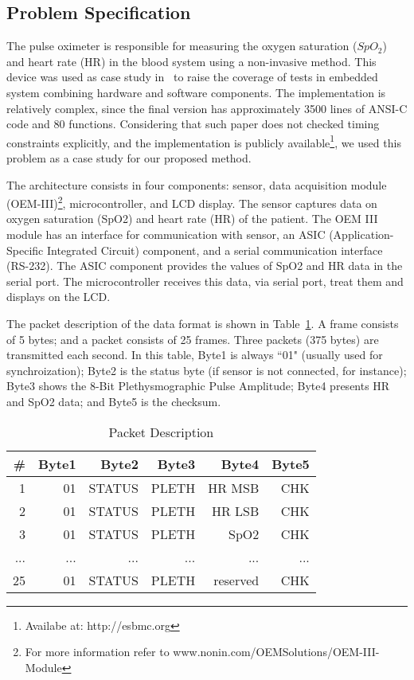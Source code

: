 \documentclass{llncs}
\begin{document}
\subsection{Problem Specification}

The pulse oximeter is responsible for measuring the oxygen saturation ($SpO_2$) and heart rate (HR) in the blood system using a
non-invasive method. 
This device was used as case study in~\cite{Cordeiro09} to raise the coverage of tests in embedded system combining
hardware and software components. The implementation is relatively complex, since the final version has approximately 3500 lines of ANSI-C code 
and 80 functions. 
Considering that such paper does not checked timing constraints explicitly, 
and the implementation is publicly available\footnote{Availabe at: http://esbmc.org}, 
we used this problem as a case study for our proposed method.

The architecture consists in four components: sensor, data acquisition module 
(OEM-III)\footnote{For more information refer to www.nonin.com/OEMSolutions/OEM-III-Module}, microcontroller, and LCD display.
The sensor captures data on oxygen saturation (SpO2) and heart rate (HR) of the patient.
The OEM III module has an interface for communication with sensor, an ASIC (Application-Specific Integrated Circuit) component, 
and a serial communication interface (RS-232).
The ASIC component provides the values of SpO2 and HR data in the serial port.
The microcontroller receives this data, via serial port, treat them and displays on the LCD.

The packet description of the data format is shown in Table~\ref{table:packet}.
A frame consists of 5 bytes; and a packet consists of 25 frames. Three packets (375 bytes) are transmitted each second.
In this table, Byte1 is always ``01" (usually used for synchroization); 
Byte2 is the status byte (if sensor is not connected, for instance);
Byte3 shows the 8-Bit Plethysmographic Pulse Amplitude; Byte4 presents HR and SpO2 data; 
and Byte5 is the checksum.




\renewcommand{\baselinestretch}{1.2}
\setlength{\tabcolsep}{4pt}
\begin{table}[!hbt]
\begin{center}
\caption{Packet Description}
\label{table:packet}
\begin{tabular}{| r | r | r | r | r | r | }
\hline
    \# & Byte1 & Byte2 & Byte3 & Byte4 & Byte5  \\
\hline\hline
    1 & 01 & STATUS & PLETH & HR MSB & CHK \\ 
\hline
    2 & 01 & STATUS & PLETH & HR LSB & CHK \\ 
\hline
    3 & 01 & STATUS & PLETH & SpO2 & CHK \\ 
\hline
    ... & ... & ... & ... & ... & ... \\ 
\hline
    25 & 01 & STATUS & PLETH & reserved & CHK \\ 
\hline
\end{tabular}
\end{center}
\end{table}
\end{document}
